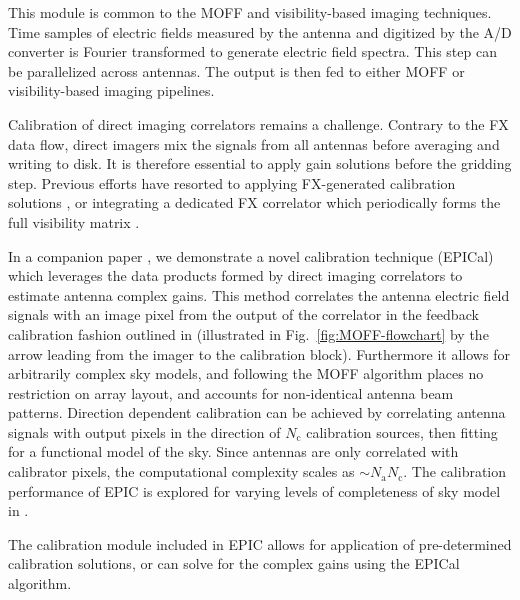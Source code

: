 \documentclass[a4paper,fleqn,usenatbib]{mnras}
\begin{document}
\par\medskip
{}
\par\medskip
\noindent This module is common to the MOFF and visibility-based imaging techniques. Time samples of electric fields measured by the antenna and digitized by the A/D converter is Fourier transformed to generate electric field spectra. This step can be parallelized across antennas. The output is then fed to either MOFF or visibility-based imaging pipelines.

\par\medskip
{}
\par\medskip
\noindent Calibration of direct imaging correlators remains a challenge. Contrary to the FX data flow, direct imagers mix the signals from all antennas before averaging and writing to disk. It is therefore essential to apply gain solutions before the gridding step. Previous efforts have resorted to applying FX-generated calibration solutions \citep{zhe14,fos14}, or integrating a dedicated FX correlator which periodically forms the full visibility matrix \citep{wij09,dev09}. 

In a companion paper \citep{bea16}, we demonstrate a novel calibration technique (EPICal) which leverages the data products formed by direct imaging correlators to estimate antenna complex gains. This method correlates the antenna electric field signals with an image pixel from the output of the correlator in the feedback calibration fashion outlined in \citealt{mor11} (illustrated in Fig.~\ref{fig:MOFF-flowchart} by the arrow leading from the imager to the calibration block). Furthermore it allows for arbitrarily complex sky models, and following the MOFF algorithm places no restriction on array layout, and accounts for non-identical antenna beam patterns. Direction dependent calibration can be achieved by correlating antenna signals with output pixels in the direction of $N_\textrm{c}$ calibration sources, then fitting for a functional model of the sky. Since antennas are only correlated with calibrator pixels, the computational complexity scales as $\sim N_\textrm{a} N_\textrm{c}$. The calibration performance of EPIC is explored for varying levels of completeness of sky model in \citet{bea16}.

The calibration module included in EPIC allows for application of pre-determined calibration solutions, or can solve for the complex gains using the EPICal algorithm.
\end{document}
